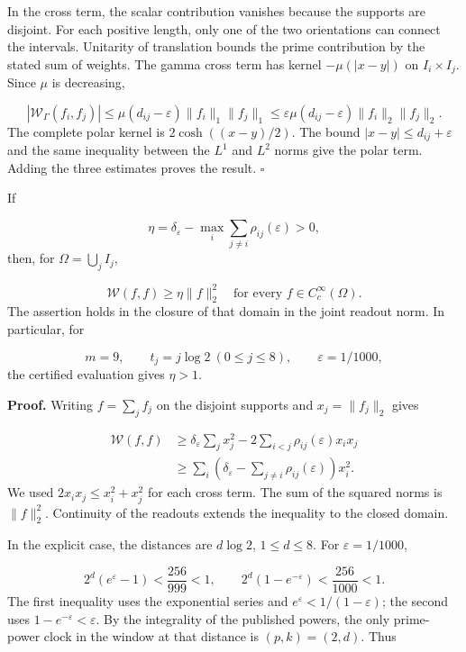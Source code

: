 In the cross term, the scalar contribution vanishes because the supports are disjoint. For each positive length, only one of the two orientations can connect the intervals. Unitarity of translation bounds the prime contribution by the stated sum of weights. The gamma cross term has kernel \(-\mu(|x-y|)\) on \(I_i\times I_j\). Since \(\mu\) is decreasing,

\[
|\mathscr W_\Gamma(f_i,f_j)|
\leq\mu(d_{ij}-\varepsilon)\|f_i\|_1\|f_j\|_1
\leq\varepsilon\mu(d_{ij}-\varepsilon)\|f_i\|_2\|f_j\|_2.
\]
The complete polar kernel is \(2\cosh((x-y)/2)\). The bound \(|x-y|\leq d_{ij}+\varepsilon\) and the same inequality between the \(L^1\) and \(L^2\) norms give the polar term. Adding the three estimates proves the result. \hfill\(\square\)

If

\[
\eta=\delta_\varepsilon-
\max_i\sum_{j\neq i}\rho_{ij}(\varepsilon)>0,
\]
then, for \(\Omega=\bigcup_j I_j\),

\[
\boxed{\mathscr W(f,f)\geq\eta\|f\|_2^2
\quad\text{for every }f\in C_c^\infty(\Omega).}
\]
The assertion holds in the closure of that domain in the joint readout norm. In particular, for

\[
m=9,\qquad t_j=j\log2\ (0\leq j\leq8),\qquad
\varepsilon=1/1000,
\]
the certified evaluation gives \(\eta>1\).

\textbf{Proof.} Writing \(f=\sum_jf_j\) on the disjoint supports and \(x_j=\|f_j\|_2\) gives

\[
\begin{aligned}
\mathscr W(f,f)&\geq
\delta_\varepsilon\sum_jx_j^2
-2\sum_{i<j}\rho_{ij}(\varepsilon)x_ix_j\\
&\geq\sum_i\left(\delta_\varepsilon-
\sum_{j\neq i}\rho_{ij}(\varepsilon)\right)x_i^2.
\end{aligned}
\]
We used \(2x_ix_j\leq x_i^2+x_j^2\) for each cross term. The sum of the squared norms is \(\|f\|_2^2\). Continuity of the readouts extends the inequality to the closed domain.

In the explicit case, the distances are \(d\log2\), \(1\leq d\leq8\). For \(\varepsilon=1/1000\),

\[
2^d(e^\varepsilon-1)<\frac{256}{999}<1,
\qquad 2^d(1-e^{-\varepsilon})<\frac{256}{1000}<1.
\]
The first inequality uses the exponential series and \(e^\varepsilon<1/(1-\varepsilon)\); the second uses \(1-e^{-\varepsilon}<\varepsilon\). By the integrality of the published powers, the only prime-power clock in the window at that distance is \((p,k)=(2,d)\). Thus

